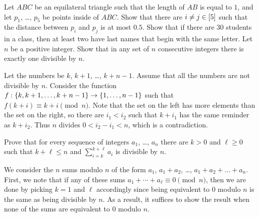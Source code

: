 \begin{chapterendexercises}
  \exercise Let $ABC$ be an equilateral triangle such that the length of $AB$ is
    equal to $1$, and let $p_1$, \dots, $p_5$ be points inside of $ABC$.
    Show that there are $i \neq j \in {[{5}]}$ such that the distance between 
    $p_i$ and $p_j$ is at most $0.5$.
  \exercise Show that if there are 30 students in a class, then at least
    two have last names that begin with the same letter.
  \exercise[recommended] Let $n$ be a positive integer. Show that in any set of
    $n$ consecutive integers there is exactly one divisible by $n$.
    \begin{solution}
      Let the numbers be $k$, $k + 1$, \dots, $k + n - 1$. Assume that all the
      numbers are not divisible by $n$. Consider the function 
      $f: \set{k, k + 1, \dots, k + n - 1} \to \set{1, \dots, n - 1}$ such that
      $f(k + i) \equiv k + i \pmod{n}$. Note that the set on the left has more
      elements than the set on the right, so there are $i_1 < i_2$ such that 
      $k + i_1$ has the same reminder as $k + i_2$.
      Thus $n$ divides $0 < i_2 - i_1 < n$, which is a contradiction.
    \end{solution}
  \exercise[recommended] Prove that for every sequence of integers $a_1$, \dots,
    $a_n$ there are $k > 0$ and $\ell \ge 0$ such that $k + \ell \le n$ and
    $\sum_{i = k}^{k + \ell} a_i$ is divisible by $n$.
    \begin{solution}
      We consider the $n$ sums modulo $n$ of the form $a_1$, $a_1 + a_2$,
      \dots, $a_1 + a_2 + \dots + a_n$. First, we note that if any of these sums
      $a_1 + \cdots + a_\ell \equiv 0 \pmod{n}$, then we are done by picking $k
      = 1$ and $\ell$ accordingly since being equivalent to $0$ modulo $n$ is
      the same as being divisible by $n$. As a result, it suffices to show the
      result when none of the sums are equivalent to $0$ modulo $n$.


\end{solution}
\end{chapterendexercises}
